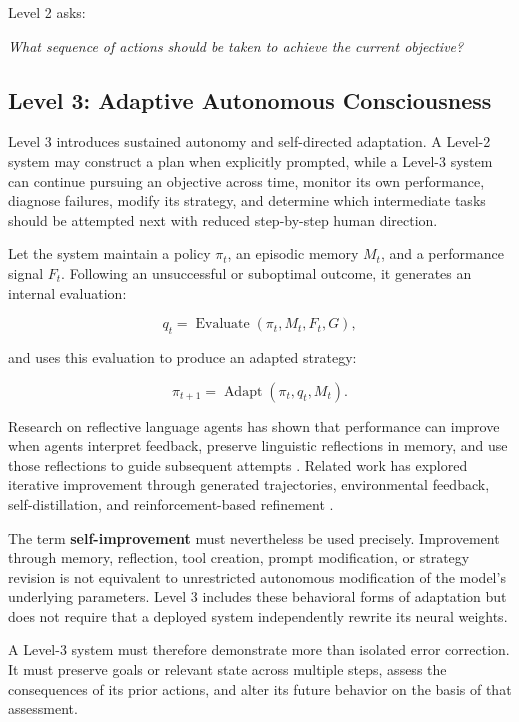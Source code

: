Level 2 asks:

\textit{What sequence of actions should be taken to achieve the current objective?}

\subsection{Level 3: Adaptive Autonomous Consciousness}

Level 3 introduces sustained autonomy and self-directed adaptation. A Level-2 system may construct a plan when explicitly prompted, while a Level-3 system can continue pursuing an objective across time, monitor its own performance, diagnose failures, modify its strategy, and determine which intermediate tasks should be attempted next with reduced step-by-step human direction.

Let the system maintain a policy \(\pi_t\), an episodic memory \(M_t\), and a performance signal \(F_t\). Following an unsuccessful or suboptimal outcome, it generates an internal evaluation:

\begin{equation}\label{eq8}
q_t
=
\operatorname{Evaluate}
\left(
\pi_t,M_t,F_t,G
\right),
\end{equation}

and uses this evaluation to produce an adapted strategy:

\begin{equation}\label{eq9}
\pi_{t+1}
=
\operatorname{Adapt}
\left(
\pi_t,q_t,M_t
\right).
\end{equation}

Research on reflective language agents has shown that performance can improve when agents interpret feedback, preserve linguistic reflections in memory, and use those reflections to guide subsequent attempts \cite{shinn2023reflexion}. Related work has explored iterative improvement through generated trajectories, environmental feedback, self-distillation, and reinforcement-based refinement \cite{aksitov2023restreact}.

The term \textbf{self-improvement} must nevertheless be used precisely. Improvement through memory, reflection, tool creation, prompt modification, or strategy revision is not equivalent to unrestricted autonomous modification of the model’s underlying parameters. Level 3 includes these behavioral forms of adaptation but does not require that a deployed system independently rewrite its neural weights.

A Level-3 system must therefore demonstrate more than isolated error correction. It must preserve goals or relevant state across multiple steps, assess the consequences of its prior actions, and alter its future behavior on the basis of that assessment.

